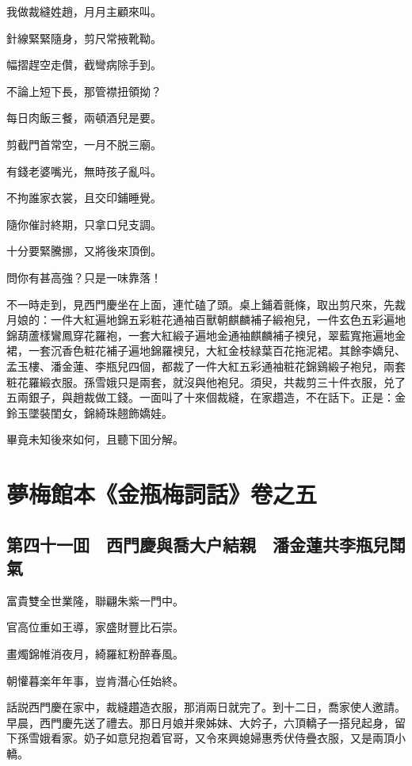我做裁縫姓趙，月月主顧來叫。

針線緊緊隨身，剪尺常掖靴靿。

幅摺趕空走儹，截彎病除手到。

不論上短下長，那管襟扭領拗？

每日肉飯三餐，兩頓酒兒是要。

剪截門首常空，一月不脱三廟。

有錢老婆嘴光，無時孩子亂呌。

不拘誰家衣裳，且交印鋪睡覺。

隨你催討終期，只拿口兒支調。

十分要緊騰挪，又將後來頂倒。

問你有甚高強？只是一味靠落！

不一時走到，見西門慶坐在上面，連忙磕了頭。桌上鋪着氈條，取出剪尺來，先裁月娘的：一件大紅遍地錦五彩粧花通袖百獸朝麒麟補子緞袍兒，一件玄色五彩遍地錦葫蘆樣鸞鳳穿花羅袍，一套大紅緞子遍地金通袖麒麟補子襖兒，翠藍寬拖遍地金裙，一套沉香色粧花補子遍地錦羅襖兒，大紅金枝緑葉百花拖泥裙。其餘李嬌兒、孟玉樓、潘金蓮、李瓶兒四個，都裁了一件大紅五彩通袖粧花錦鷄緞子袍兒，兩套粧花羅緞衣服。孫雪娥只是兩套，就沒與他袍兒。須臾，共裁剪三十件衣服，兑了五兩銀子，與趙裁做工錢。一面叫了十來個裁縫，在家趲造，不在話下。正是：金鈴玉墜裝閨女，錦綺珠翹飾嬌娃。

畢竟未知後來如何，且聽下囬分解。

\part*{夢梅館本《金瓶梅詞話》卷之五}

\chapter*{第四十一囬　西門慶與喬大户結親　潘金蓮共李瓶兒鬦氣}

富貴雙全世業隆，聯翩朱紫一門中。

官高位重如王導，家盛財豐比石崇。

畫燭錦帷消夜月，綺羅紅粉醉春風。

朝懽暮楽年年事，豈肯潛心任始終。

話説西門慶在家中，裁縫趲造衣服，那消兩日就完了。到十二日，喬家使人邀請。早晨，西門慶先送了禮去。那日月娘并衆姊妹、大妗子，六頂轎子一搭兒起身，留下孫雪娥看家。奶子如意兒抱着官哥，又令來興媳婦惠秀伏侍疊衣服，又是兩頂小轎。

